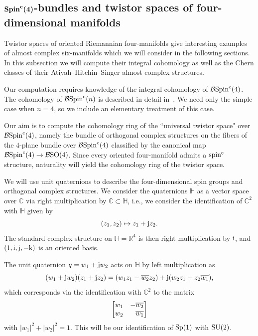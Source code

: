 \documentclass[pdftex]{sigma}%
\newcommand{\R}{\mathbb{R}}
\newcommand{\C}{\mathbb{C}}
\newcommand{\HH}{\mathbb{H}}
\DeclareMathOperator{\Spin}{Spin}
\numberwithin{equation}{section}
\begin{document}
\subsection[Spin\^{}c(4)-bundles and twistor spaces of four-dimensional manifolds]{$\boldsymbol{\Spin^{\rm c}(4)}$-bundles and twistor spaces of four-dimensional manifolds}

Twistor spaces of oriented Riemannian four-manifolds give interesting examples of almost complex six-manifolds which we will consider in the following sections. In this subsection we will compute their integral cohomology as well as the Chern classes of
their Atiyah--Hitchin--Singer almost complex structures.

Our computation requires knowledge of the integral cohomology of ${\mathcal B}{\rm Spin}^{\rm c}(4)$. The cohomology of ${\mathcal B}{\rm Spin}^{\rm c}(n)$ is described in detail in~\cite{Du18}. We need only the simple case when $n=4$, so we include an elementary treatment of this case.

Our aim is to compute the cohomology ring of the ``universal twistor space" over ${\mathcal B}{\rm Spin}^{\rm c}(4)$, namely the bundle of orthogonal complex structures on the fibers of the $4$-plane bundle over ${\mathcal B}{\rm Spin}^{\rm c}(4)$ classified by the canonical map ${\mathcal B}{\rm Spin}^{\rm c}(4) \to {\mathcal B}{\rm SO}(4)$. Since every oriented four-manifold admits a ${\rm spin}^{\rm c}$ structure, naturality will
yield the cohomology ring of the twistor space.

We will use unit quaternions to describe the four-dimensional spin groups and orthogonal complex structures. We consider the quaternions $\HH$ as a vector space over $\C$ via
right multiplication by $\C \subset \HH$, i.e., we consider the identification of $\C^2$ with $\HH$ given by
\[ (z_1, z_2) \mapsto z_1 + {\rm j}z_2. \]
The standard complex structure on $\HH= \R^4$ is then right multiplication by ${\rm i}$,
and $(1,{\rm i},{\rm j},-{\rm k})$ is an oriented basis.

The unit quaternion $q= w_1 + {\rm j} w_2$ acts on $\HH$ by left multiplication as
\[ (w_1 + {\rm j}w_2) (z_1+{\rm j}z_2) = (w_1z_1 -\overline{w_2} z_2) + {\rm j}(w_2 z_1+z_2 \overline{w_1} ),\]
which corresponds via the identification with $\C^2$ to the matrix
\[
\left[ \begin{matrix}
w_1 & -\overline{w_2} \\
w_2 & \hphantom{-}\overline{w_1}
\end{matrix}
\right]
\]
with $|w_1|^2 +|w_2|^2=1$. This will be our identification of ${\rm Sp}(1)$ with ${\rm SU}(2)$.
\end{document}
